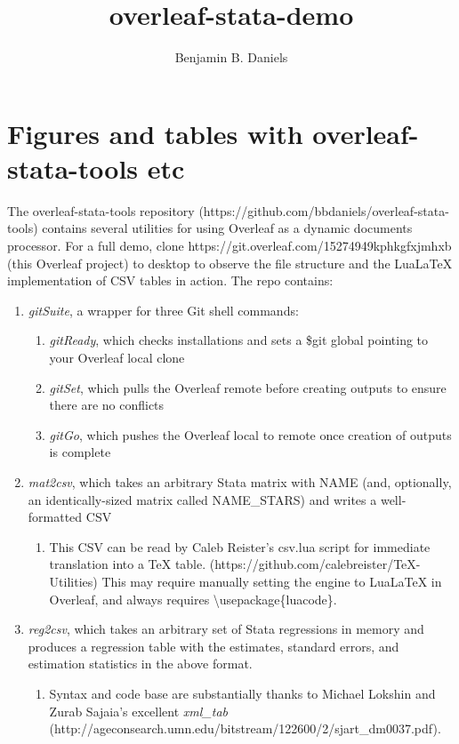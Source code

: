 \documentclass[a4paper]{article}
\title{overleaf-stata-demo}
\author{Benjamin B. Daniels}
\begin{document}
\maketitle

\section{Figures and tables with overleaf-stata-tools etc}

The overleaf-stata-tools repository (https://github.com/bbdaniels/overleaf-stata-tools) contains several utilities for using Overleaf as a dynamic documents processor. For a full demo, clone https://git.overleaf.com/15274949kphkgfxjmhxb (this Overleaf project) to desktop to observe the file structure and the LuaLaTeX implementation of CSV tables in action. The repo contains:

\begin{enumerate}
\item {\it gitSuite}, a wrapper for three Git shell commands:
	\begin{enumerate}
	\item {\it gitReady}, which checks installations and sets a \${git} global pointing to your Overleaf local clone
    \item {\it gitSet}, which pulls the Overleaf remote before creating outputs to ensure there are no conflicts
    \item {\it gitGo}, which pushes the Overleaf local to remote once creation of outputs is complete
    \end{enumerate}
\item {\it mat2csv}, which takes an arbitrary Stata matrix with NAME (and, optionally, an identically-sized matrix called NAME\_STARS) and writes a well-formatted CSV
	\begin{enumerate}
	\item This CSV can be read by Caleb Reister's csv.lua script for immediate translation into a TeX table. (https://github.com/calebreister/TeX-Utilities) This may require manually setting the engine to LuaLaTeX in Overleaf, and always requires \textbackslash usepackage\{luacode\}.
    \end{enumerate}
\item {\it reg2csv}, which takes an arbitrary set of Stata regressions in memory and produces a regression table with the estimates, standard errors, and estimation statistics in the above format.
	\begin{enumerate}
	\item Syntax and code base are substantially thanks to Michael Lokshin and Zurab Sajaia's excellent {\it xml\_tab} (http://ageconsearch.umn.edu/bitstream/122600/2/sjart\_dm0037.pdf).
    \end{enumerate}
    
\end{enumerate}
\end{document}
